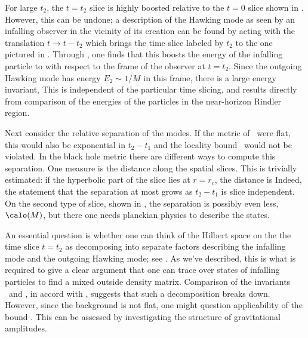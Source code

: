 For large $t_2$, the $t=t_2$ slice is highly boosted relative to the $t=0$ slice shown in \Krusk.  However, this can be undone;
a description of the Hawking mode as seen by an infalling observer in the vicinity of its creation can be found by acting with the translation $t\rightarrow t-t_2$ which brings the time slice labeled by $t_2$ to the one pictured in \Krusk.  Through \kruskxm, one finds that this boosts the energy of the infalling particle to
%
\eqn{}
%
with respect to the frame of the observer at $t=t_2$.  Since the outgoing Hawking mode has energy $E_2\sim 1/M$ in this frame, there is a large energy invariant,
%
\eqn{}
%
This is independent of the particular time slicing, and results directly from comparison of the energies of the particles in the near-horizon Rindler region.

Next consider the relative separation of the modes.  If the metric of \Krusk\ were flat, this would also be exponential in $t_2-t_1$ and the locality bound \locbd\ would not be violated.  In the black hole metric there are different ways to compute this separation.  One measure is the distance along the spatial slices.  This is trivially estimated: if the hyperbolic part of the slice lies at $r=r_c$, the distance is
%
\eqn{}
%
Indeed, the statement that the separation at most grows as $t_2-t_1$ is slice independent.
On the second type of slice, shown in \singslice, the separation is possibly even less, $\calo(M)$, but there one needs planckian physics to describe the states.



An essential question is whether one can think of the Hilbert space on the the time slice $t=t_2$ as decomposing into separate factors describing the infalling mode and the outgoing Hawking mode; see \intmodes.  As we've described, this is what is required to give a clear argument that one can trace over states of infalling particles to find a mixed outside density matrix.
Comparison of the invariants \largeinvt\ and \distance, in accord with \locbd, suggests that such a decomposition breaks down.  However, since the background is not flat, one might question applicability of the bound \locbd.  This can be assessed by investigating the structure of gravitational amplitudes.

